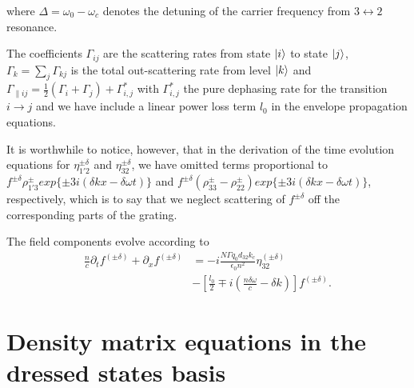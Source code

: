\documentclass[]{spie}  %
\def\dw{\delta\omega}
\def\dk{\delta k}
\begin{document}
where $\Delta = \omega_0 - \omega_c$ denotes the detuning of the carrier frequency from $3\leftrightarrow2$ resonance. 

The coefficients $\Gamma_{ij} $ are the scattering rates from state $\ket{i}$ to state $\ket{j}$, $\Gamma_k = \sum_{j}\Gamma_{kj}$ is the total out-scattering rate from level $\ket{k}$ and $\Gamma_{\parallel ij} = \frac{1}{2}(\Gamma_{i} + \Gamma_j) + \Gamma_{i,j}^*$ with $\Gamma_{i,j}^*$ the pure dephasing rate for the transition $i\rightarrow j$ and we have include a linear power loss term $l_0$ in the envelope propagation equations. 

It is worthwhile to notice, however, that in the derivation of the time evolution equations for $\eta_{1'2}^{\pm\delta}$ and $\eta_{32}^{\pm\delta}$, we have omitted terms proportional to $f^{\pm\delta}\rho_{1'3}^{\pm}exp\{\pm3i(\dk x - \dw t)\}$ and $f^{\pm\delta}(\rho_{33}^{\pm}-\rho_{22}^{\pm})exp\{\pm3i(\dk x - \dw t)\}$, respectively, which is to say that we neglect scattering of $f^{\pm\delta}$ off the corresponding parts of the grating.

The field components evolve according to
\begin{align}
\frac{n}{c}\partial_t f^{(\pm \delta)} + \partial_{x}f^{(\pm \delta)}&= -i\frac{N \Gamma q_0d_{32} k_c}{\epsilon_0 n^2} \eta_{32}^{(\pm \delta)}  \nonumber \\ 
&-\left[\frac{l_0}{2}  \mp i (\frac{n\delta\omega}{c}-\delta k)\right] f^{(\pm \delta)}\label{eq:rtwave-temphole}.
\end{align}


\section{Density matrix equations in the dressed states basis}
\label{sec:biasdependence}
 
\end{document}
